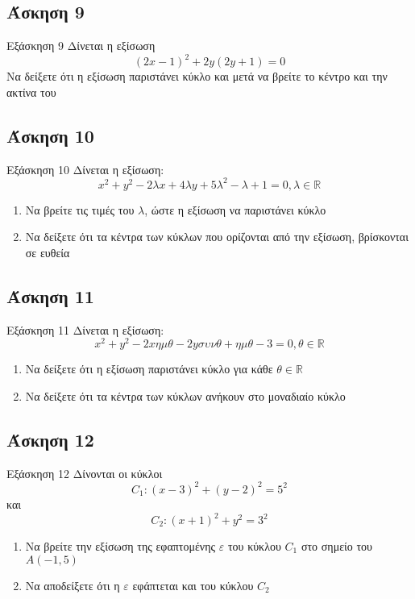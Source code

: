 \documentclass[greek]{beamer}
\begin{document}
\subsection{Άσκηση 9}
\begin{frame}[label=Άσκηση9,t]{Εξάσκηση 9}
 Δίνεται η εξίσωση
 $$(2x-1)^2+2y(2y+1)=0$$
 Να δείξετε ότι η εξίσωση παριστάνει κύκλο και μετά να βρείτε το κέντρο και την ακτίνα του

\end{frame}

\subsection{Άσκηση 10}
\begin{frame}[label=Άσκηση10,t]{Εξάσκηση 10}
 Δίνεται η εξίσωση:
 $$x^2+y^2-2λx+4λy+5λ^2-λ+1=0,λ\in\mathbb{R}$$
 \begin{enumerate}
  \item<1-> Να βρείτε τις τιμές του $λ$, ώστε η εξίσωση να παριστάνει κύκλο
  \item<2-> Να δείξετε ότι τα κέντρα των κύκλων που ορίζονται από την εξίσωση, βρίσκονται σε ευθεία
 \end{enumerate}

\end{frame}

\subsection{Άσκηση 11}
\begin{frame}[label=Άσκηση11,t]{Εξάσκηση 11}
 Δίνεται η εξίσωση:
 $$x^2+y^2-2xημθ-2yσυνθ+ημθ-3=0,θ\in\mathbb{R}$$
 \begin{enumerate}
  \item<1-> Να δείξετε ότι η εξίσωση παριστάνει κύκλο για κάθε $θ\in\mathbb{R}$
  \item<2-> Να δείξετε ότι τα κέντρα των κύκλων ανήκουν στο μοναδιαίο κύκλο
 \end{enumerate}

\end{frame}

\subsection{Άσκηση 12}
\begin{frame}[label=Άσκηση12,t]{Εξάσκηση 12}
 Δίνονται οι κύκλοι
 $$C_1:(x-3)^2+(y-2)^2=5^2$$
 και
 $$C_2:(x+1)^2+y^2=3^2$$
 \begin{enumerate}
  \item<1-> Να βρείτε την εξίσωση της εφαπτομένης $ε$ του κύκλου $C_1$ στο σημείο του $Α(-1,5)$
  \item<2-> Να αποδείξετε ότι η $ε$ εφάπτεται και του κύκλου $C_2$
 \end{enumerate}

\end{frame}
\end{document}
